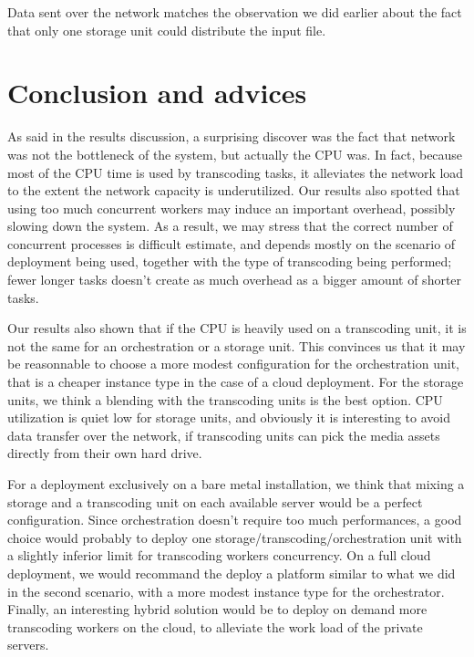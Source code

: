 \documentclass[a4paper, titlepage]{paper}
\numberwithin{figure}{section}
\numberwithin{table}{section}
\begin{document}
        Data sent over the network matches the observation we did earlier about the fact that only one storage unit could distribute the input file.

  \section{Conclusion and advices}
    As said in the results discussion, a surprising discover was the fact that network was not the bottleneck of the system, but actually the CPU was. In fact, because most of the CPU time is used by transcoding tasks, it alleviates the network load to the extent the network capacity is underutilized. Our results also spotted that using too much concurrent workers may induce an important overhead, possibly slowing down the system. As a result, we may stress that the correct number of concurrent processes is difficult estimate, and depends mostly on the scenario of deployment being used, together with the type of transcoding being performed; fewer longer tasks doesn't create as much overhead as a bigger amount of shorter tasks.
    
    Our results also shown that if the CPU is heavily used on a transcoding unit, it is not the same for an orchestration or a storage unit. This convinces us that it may be reasonnable to choose a more modest configuration for the orchestration unit, that is a cheaper instance type in the case of a cloud deployment. For the storage units, we think a blending with the transcoding units is the best option. CPU utilization is quiet low for storage units, and obviously it is interesting to avoid data transfer over the network, if transcoding units can pick the media assets directly from their own hard drive.

    For a deployment exclusively on a bare metal installation, we think that mixing a storage and a transcoding unit on each available server would be a perfect configuration. Since orchestration doesn't require too much performances, a good choice would probably to deploy one storage/transcoding/orchestration unit with a slightly inferior limit for transcoding workers concurrency. On a full cloud deployment, we would recommand the deploy a platform similar to what we did in the second scenario, with a more modest instance type for the orchestrator. Finally, an interesting hybrid solution would be to deploy on demand more transcoding workers on the cloud, to alleviate the work load of the private servers.
\end{document}
